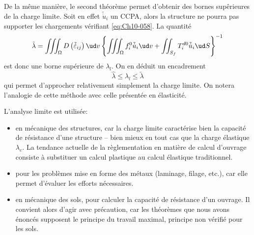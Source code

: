 De la même manière, le second théorème permet d'obtenir des bornes supêrieures de la charge limite.
Soit en effet $\tilde{\dot{u}}_i$ un CCPA, alors la structure ne pourra pas supporter les chargements vérifiant \eqref{eq:Ch10-058}.
La quantité 
\begin{equation}
    \tilde{\lambda} = \iiint_{\Omega} D \left( \tilde{\dot{\varepsilon}}_{ij} \right) \ud v \left\{ \iiint_{\Omega} f_i^0 \tilde{\dot{u}}_i \ud v + \iint_{S_f} T_i^{d0} \tilde{\dot{u}}_i \ud S \right\}^{-1}
    \label{eq:Ch10-060}
\end{equation}
est donc une borne supérieure de $\lambda_l$.
On en déduit un encadrement 
\begin{equation}
    \hat{\lambda} \leq \lambda_l \leq \tilde{\lambda}
    \label{eq:Ch10-061}
\end{equation}
qui permet d'approcher relativement simplement la charge limite. 
On notera l'analogie de cette méthode avec celle présentée en élasticité. 

L'analyse limite est utilisée:
\begin{itemize}
    \item en mécanique des structures, car la charge limite caractérise bien la capacité de résistance d'une structure -- bien mieux en tout cas que la charge élastique $\lambda_e$.
        La tendance actuelle de la règlementation en matière de calcul d'ouvrage consiste à substituer un calcul plastique au calcul élastique traditionnel. 
    \item pour les problèmes mise en forme des métaux (laminage, filage, etc.), car elle permet d'évaluer les efforts nécessaires. 
    \item en mécanique des sols, pour calculer la capacité de résistance d'un ouvrage.
        Il convient alors d'agir avec précaution, car les théorèmes que nous avons énoncés supposent le principe du travail maximal, principe non vérifié pour les sols. 
\end{itemize}
